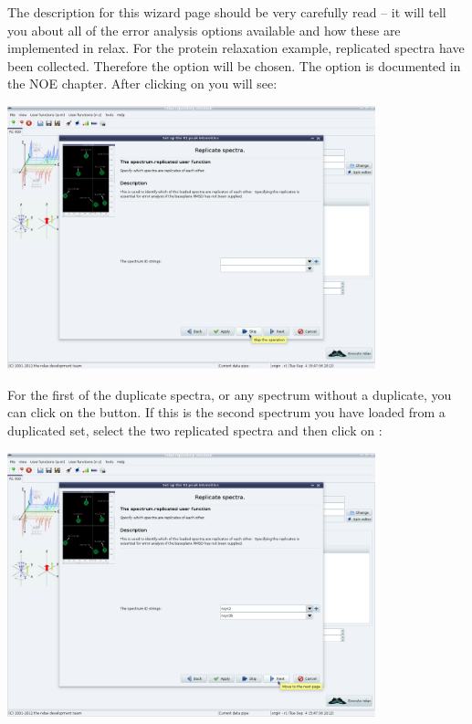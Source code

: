 The description for this wizard page should be very carefully read -- it will tell you about all of the error analysis options available and how these are implemented in relax.  For the protein relaxation example, replicated spectra have been collected.  Therefore the option  will be chosen.  The  option is documented in the NOE chapter.  After clicking on  you will see:

\begin{minipage}[h]{\linewidth}
\centerline{\includegraphics[width=0.8\textwidth, bb=14 14 1415 1019]{graphics/screenshots/r1_analysis/peak_intensity_replicates1}}
\end{minipage}

For the first of the duplicate spectra, or any spectrum without a duplicate, you can click on the  button.  If this is the second spectrum you have loaded from a duplicated set, select the two replicated spectra and then click on :

\begin{minipage}[h]{\linewidth}
\centerline{\includegraphics[width=0.8\textwidth, bb=14 14 1415 1019]{graphics/screenshots/r1_analysis/peak_intensity_replicates2}}
\end{minipage}

